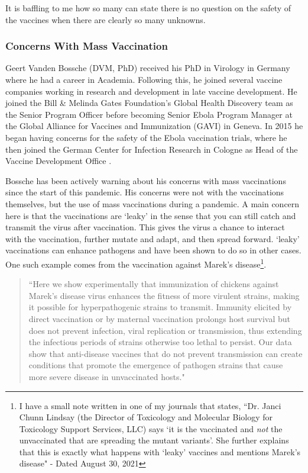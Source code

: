 \documentclass[10pt, a4paper, twocolumn]{book}
\begin{document}
It is baffling to me how so many can state there is no question on the safety of the vaccines when there are clearly so many unknowns. 






\subsubsection{Concerns With Mass Vaccination}

Geert Vanden Bossche (DVM, PhD) received his PhD in Virology in Germany where he had a career in Academia. Following this, he joined several vaccine companies working in research and development in late vaccine development. He joined the Bill \& Melinda Gates Foundation’s Global Health Discovery team as the Senior Program Officer before becoming Senior Ebola Program Manager at the Global Alliance for Vaccines and Immunization (GAVI) in Geneva. In 2015 he began having concerns for the safety of the Ebola vaccination trials, where he then joined the German Center for Infection Research in Cologne as Head of the Vaccine Development Office \citep{GeertVandenBosscheAbout}. 

Bossche has been actively warning about his concerns with mass vaccinations since the start of this pandemic. His concerns were not with the vaccinations themselves, but the use of mass vaccinations during a pandemic. A main concern here is that the vaccinations are `leaky' in the sense that you can still catch and transmit the virus after vaccination. This gives the virus a chance to interact with the vaccination, further mutate and adapt, and then spread forward. `leaky' vaccinations can enhance pathogens and have been shown to do so in other cases. One such example comes from the vaccination against Marek's disease\footnote{I have a small note written in one of my journals that states, ``Dr. Janci Chunn Lindsay  (the Director of Toxicology and Molecular Biology for Toxicology Support Services, LLC) says `it is the vaccinated and \textit{not} the unvaccinated that are spreading the mutant variants'. She further explains that this is exactly what happens with `leaky' vaccines and mentions Marek's disease" - Dated August 30, 2021}.

\begin{quotation}
	``Here we show experimentally that immunization of chickens against Marek's disease virus enhances the fitness of more virulent strains, making it possible for hyperpathogenic strains to transmit. Immunity elicited by direct vaccination or by maternal vaccination prolongs host survival but does not prevent infection, viral replication or transmission, thus extending the infectious periods of strains otherwise too lethal to persist. Our data show that anti-disease vaccines that do not prevent transmission can create conditions that promote the emergence of pathogen strains that cause more severe disease in unvaccinated hosts." \citep{MareksDisease}
\end{quotation}
\end{document}
